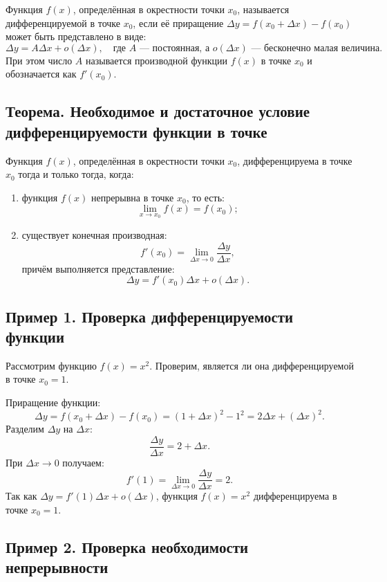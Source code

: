 \documentclass{article}
\begin{document}
Функция \( f(x) \), определённая в окрестности точки \( x_0 \), называется дифференцируемой в точке \( x_0 \), если её приращение \( \Delta y = f(x_0 + \Delta x) - f(x_0) \) может быть представлено в виде:
\[
\Delta y = A \Delta x + o(\Delta x), \quad \text{где } A \text{ — постоянная, а } o(\Delta x) \text{ — бесконечно малая величина}.
\]
При этом число \( A \) называется производной функции \( f(x) \) в точке \( x_0 \) и обозначается как \( f'(x_0) \).

\subsection{Теорема. Необходимое и достаточное условие дифференцируемости функции в точке}

Функция \( f(x) \), определённая в окрестности точки \( x_0 \), дифференцируема в точке \( x_0 \) тогда и только тогда, когда:
\begin{enumerate}
    \item функция \( f(x) \) непрерывна в точке \( x_0 \), то есть:
    \[
    \lim_{x \to x_0} f(x) = f(x_0);
    \]
    \item существует конечная производная:
    \[
    f'(x_0) = \lim_{\Delta x \to 0} \frac{\Delta y}{\Delta x},
    \]
    причём выполняется представление:
    \[
    \Delta y = f'(x_0) \Delta x + o(\Delta x).
    \]
\end{enumerate}

\subsection{Пример 1. Проверка дифференцируемости функции}

Рассмотрим функцию \( f(x) = x^2 \). Проверим, является ли она дифференцируемой в точке \( x_0 = 1 \).

Приращение функции:
\[
\Delta y = f(x_0 + \Delta x) - f(x_0) = (1 + \Delta x)^2 - 1^2 = 2\Delta x + (\Delta x)^2.
\]
Разделим \( \Delta y \) на \( \Delta x \):
\[
\frac{\Delta y}{\Delta x} = 2 + \Delta x.
\]
При \( \Delta x \to 0 \) получаем:
\[
f'(1) = \lim_{\Delta x \to 0} \frac{\Delta y}{\Delta x} = 2.
\]
Так как \( \Delta y = f'(1) \Delta x + o(\Delta x) \), функция \( f(x) = x^2 \) дифференцируема в точке \( x_0 = 1 \).

\subsection{Пример 2. Проверка необходимости непрерывности}
\end{document}
